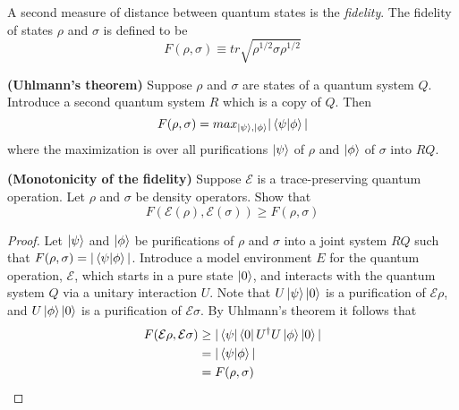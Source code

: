 A second measure of distance between quantum states is the \textit{fidelity}. The fidelity of states $\rho$ and $\sigma$ is defined to be
$$F(\rho,\sigma) ≡ tr\sqrt{\rho^{1/2}\sigma\rho^{1/2}}$$
\begin{theorem}
    \textbf{(Uhlmann’s theorem)} Suppose $\rho$ and $\sigma$ are states of a quantum system $Q$. Introduce a second quantum system $R$ which is a copy of $Q$. Then
    $$F(\rho, \sigma)= max_{\ket{\psi}, \ket{\phi}} |\braket{\psi}{\phi}|$$
    where the maximization is over all purifications $\ket{\psi}$ of $\rho$ and $\ket{\phi}$ of $\sigma$ into $RQ$.
\end{theorem}
\begin{theorem}
    \textbf{(Monotonicity of the fidelity)} Suppose $\mathcal{E}$ is a trace-preserving quantum operation. Let $\rho$ and $\sigma$ be density operators. Show that
    $$F(\mathcal{E}(\rho), \mathcal{E}(\sigma)) \geq F(\rho, \sigma)$$
\end{theorem}
\begin{proof}
    Let $\ket{\psi}$ and $\ket{\phi}$ be purifications of $\rho$ and $\sigma$ into a joint system $RQ$ such that $F(\rho, \sigma) = |\braket{\psi}{\phi}|$. Introduce a model environment $E$ for the quantum operation, $\mathcal{E}$, which starts in a pure state $\ket{0}$, and interacts with the quantum system $Q$ via a unitary interaction $U$. Note that $U\ket{\psi}\ket{0}$ is a purification of $\mathcal{E}\rho$, and $U\ket{\phi}\ket{0}$ is a purification of $\mathcal{E}\sigma$. By Uhlmann's theorem it follows that
    \begin{equation*}
    \begin{split}
        F(\mathcal{E}\rho, \mathcal{E}\sigma) & \geq |\bra{\psi}\bra{0}U^\dag U\ket{\phi}\ket{0}|\\
        & = |\braket{\psi}{\phi}|\\
        & = F(\rho, \sigma)
    \end{split}
    \end{equation*}
\end{proof}